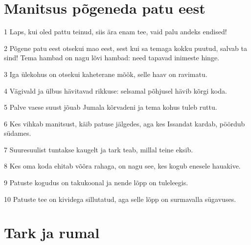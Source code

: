 \section*{Manitsus põgeneda patu eest}

\par 1 Laps, kui oled pattu teinud, siis ära enam tee, vaid palu andeks endised!
\par 2 Põgene patu eest otsekui mao eest, sest kui sa temaga kokku puutud, salvab ta sind! Tema hambad on nagu lõvi hambad: need tapavad inimeste hinge.
\par 3 Iga ülekohus on otsekui kaheterane mõõk, selle haav on ravimatu.
\par 4 Vägivald ja ülbus hävitavad rikkuse: selsamal põhjusel hävib kõrgi koda.
\par 5 Palve vaese suust jõuab Jumala kõrvadeni ja tema kohus tuleb ruttu.
\par 6 Kes vihkab manitsust, käib patuse jälgedes, aga kes Issandat kardab, pöördub südames.
\par 7 Suuresuulist tuntakse kaugelt ja tark teab, millal teine eksib.
\par 8 Kes oma koda ehitab võõra rahaga, on nagu see, kes kogub enesele hauakive.
\par 9 Patuste kogudus on takukoonal ja nende lõpp on tuleleegis.
\par 10 Patuste tee on kividega sillutatud, aga selle lõpp on surmavalla sügavuses.

\section*{Tark ja rumal}

